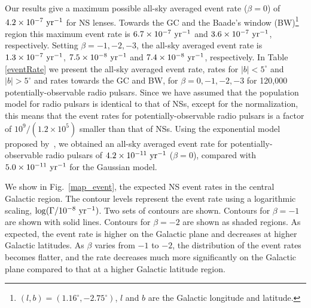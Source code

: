 \documentclass[iop,apj]{emulateapj}
\begin{document}
Our results give a maximum possible all-sky averaged event rate
($\beta = 0$) of $4.2\times10^{-7}\ \rm{yr^{-1}}$ for NS
lenses. Towards the GC and the Baade's window
(BW)\footnote{$(l,b)=(1.16^{\circ},-2.75^{\circ})$, $l$ and $b$ are
the Galactic longitude and latitude.} region this maximum event rate
is $6.7\times10^{-7}\ \rm{yr^{-1}}$ and $3.6\times10^{-7}\ \rm{yr^{-1}}$,  
respectively. Setting $\beta=-1,-2,-3$, the all-sky averaged event
rate is $1.3\times10^{-7}\ \rm{yr^{-1}}$,
$7.5\times10^{-8}\ \rm{yr^{-1}}$ and $7.4\times10^{-8}\ \rm{yr^{-1}}$,
respectively. In Table \ref{eventRate} we present the all-sky averaged
event rate, rates for $\mid b\mid<5^{\circ}$ and $\mid
b\mid>5^{\circ}$ and rates towards the GC and BW, for
$\beta=0,-1,-2,-3$ for 120,000 potentially-observable radio
pulsars. Since we have assumed that the population model for radio
pulsars is identical to that of NSs, except for the normalization, this
means that the event rates for potentially-observable radio pulsars is
a factor of $10^9/\left(1.2\times10^5\right)$ smaller than that of NSs.
Using the exponential	model proposed by~\citet{Faucher}, we obtained an
all-sky averaged event rate for potentially-observable radio
pulsars of $4.2\times10^{-11}\ \rm{yr^{-1}}$ ($\beta=0$), compared 
with $5.0\times10^{-11}\ \rm{yr^{-1}}$ for the Gaussian model.

We show in Fig.~\ref{map_event}, the expected NS event rates in the
central Galactic region. The contour levels represent the event rate
using a logarithmic scaling, $\log(\Gamma/10^{-8}\ \rm{yr^{-1}})$.
Two sets of contours are shown. Contours for $\beta = -1$ are shown with solid lines.  
Contours for $\beta = -2$ are shown as shaded regions. As expected, the event rate is higher 
on the Galactic plane and decreases at higher Galactic latitudes. As $\beta$ varies from $-1$ 
to $-2$, the distribution of the event rates becomes flatter, and the rate decreases much more 
significantly on the Galactic plane compared to that at a higher Galactic latitude region. 
\end{document}

